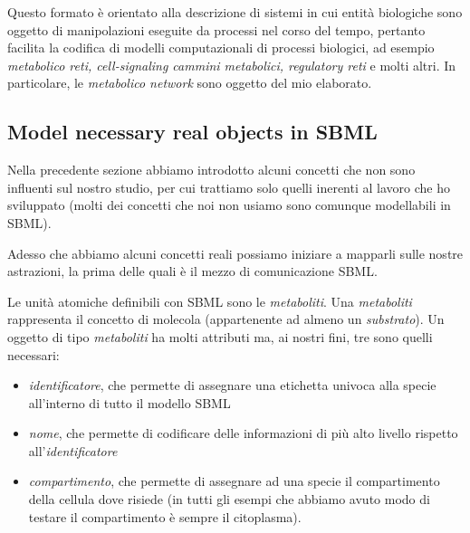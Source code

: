 Questo formato \`e orientato alla descrizione di sistemi in cui
entit\`a biologiche sono oggetto di manipolazioni eseguite da processi
nel corso del tempo, pertanto facilita la codifica di modelli
computazionali di processi biologici, ad esempio \emph{metabolico
  reti, cell-signaling cammini metabolici, regulatory reti} e molti
altri. In particolare, le \emph{metabolico network} sono oggetto del
mio elaborato.

\subsection{Model necessary real objects in SBML}
\label{sec:necessaryRealObjectsModeledInSBML}

Nella precedente sezione abbiamo introdotto alcuni concetti che non
sono influenti sul nostro studio, per cui trattiamo solo quelli
inerenti al lavoro che ho sviluppato (molti dei concetti che noi non
usiamo sono comunque modellabili in SBML).

Adesso che abbiamo alcuni concetti reali possiamo iniziare a mapparli
sulle nostre astrazioni, la prima delle quali \`e il mezzo di
comunicazione SBML. 
  
Le unit\`a atomiche definibili con SBML sono le \emph{metaboliti}. Una
\emph{metaboliti} rappresenta il concetto di molecola (appartenente ad
almeno un \emph{substrato}).  Un oggetto di tipo \emph{metaboliti} ha
molti attributi ma, ai nostri fini, tre sono quelli necessari:
\begin{itemize}
\item \emph{identificatore}, che permette di assegnare una etichetta univoca
alla specie all'interno di tutto il modello SBML
\item \emph{nome}, che permette di codificare delle informazioni di
  pi\`u alto livello rispetto all'\emph{identificatore}
\item \emph{compartimento}, che permette di assegnare ad una specie il
compartimento della cellula dove risiede (in tutti gli esempi che
abbiamo avuto modo di testare il compartimento \`e sempre il
citoplasma).
\end{itemize}

